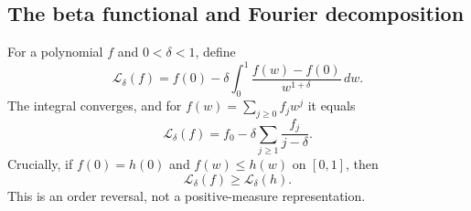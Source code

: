 \documentclass[11pt,a4paper]{article}
\theoremstyle{definition}\newtheorem{definition}[theorem]{Definition}
\theoremstyle{remark}\newtheorem{remark}[theorem]{Remark}
\numberwithin{equation}{section}
\begin{document}
\subsection{The beta functional and Fourier decomposition}\label{S08-sec-3}
For a polynomial $f$ and $0<\delta<1$, define
\begin{equation}\label{S08-functional}
 \mathcal L_\delta(f)=f(0)-\delta\int_0^1
 \frac{f(w)-f(0)}{w^{1+\delta}}\,dw.
\end{equation}
The integral converges, and for $f(w)=\sum_{j\ge0}f_jw^j$ it equals
\[
 \mathcal L_\delta(f)=f_0-\delta\sum_{j\ge1}\frac{f_j}{j-\delta}.
\]
Crucially, if $f(0)=h(0)$ and $f(w)\le h(w)$ on $[0,1]$, then
\begin{equation}\label{S08-reverse}
 \mathcal L_\delta(f)\ge\mathcal L_\delta(h).
\end{equation}
This is an order reversal, not a positive-measure representation.
\end{document}
